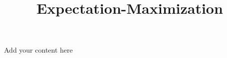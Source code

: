 \title{Expectation-Maximization}
\label{chp:expectation-maximization}
\author{}
\institute{}
\maketitle

Add your content here




